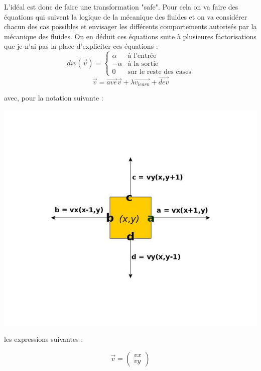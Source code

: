 \documentclass[10pt]{article}
\begin{document}
L'idéal est donc de faire une transformation "safe". Pour cela on va faire des équations qui suivent la logique de la mécanique des fluides et on va considérer chacun des cas possibles et envisager les différents comportements autorisés par la mécanique des fluides. On en déduit ces équations suite à plusieures factorisations que je n'ai pas la place d'expliciter ces équations :
\begin{equation}
 div(\overrightarrow{v}) =
\begin{cases}
	\alpha & \text{à l'entrée} \\
	-\alpha & \text{à la sortie} \\
	0 & \text{sur le reste des cases}
\end{cases}
\end{equation}
\begin{equation}
\overrightarrow{v} = \overrightarrow{ave}\overrightarrow{v} +\lambda\overrightarrow{v_{learn}} +\overrightarrow{dev}
\end{equation}

avec, pour la notation suivante :\\
\begin{center}
\includegraphics[scale=0.3]{notation.jpg}\\
\end{center}

les expressions suivantes :

\[ \overrightarrow{v} = 
\begin{pmatrix}
vx \\
vy
\end{pmatrix}
\]
\end{document}
